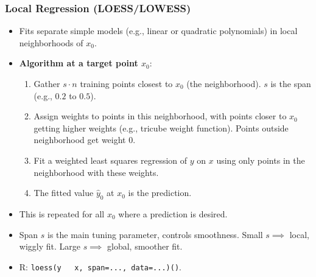 \documentclass[12pt,a4paper]{article}
\newcommand{\Rfunction}[1]{\texttt{#1()}} %
\begin{document}
\begin{itemize}
    \subsubsection{Local Regression (LOESS/LOWESS)}
        \begin{itemize}
            \item Fits separate simple models (e.g., linear or quadratic polynomials) in local neighborhoods of $x_0$.
            \item \textbf{Algorithm at a target point $x_0$}:
                \begin{enumerate}
                    \item Gather $s \cdot n$ training points closest to $x_0$ (the neighborhood). $s$ is the span (e.g., $0.2$ to $0.5$).
                    \item Assign weights to points in this neighborhood, with points closer to $x_0$ getting higher weights (e.g., tricube weight function). Points outside neighborhood get weight 0.
                    \item Fit a weighted least squares regression of $y$ on $x$ using only points in the neighborhood with these weights.
                    \item The fitted value $\hat{y}_0$ at $x_0$ is the prediction.
                \end{enumerate}
            \item This is repeated for all $x_0$ where a prediction is desired.
            \item Span $s$ is the main tuning parameter, controls smoothness. Small $s \implies$ local, wiggly fit. Large $s \implies$ global, smoother fit.
            \item R: \Rfunction{loess(y ~ x, span=..., data=...)}.
        \end{itemize}


\end{itemize}
\end{document}
